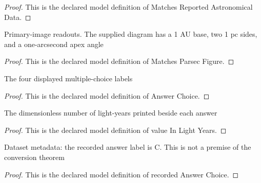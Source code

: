 \begin{proof}
  This is the declared model definition of Matches Reported Astronomical Data.
\end{proof}
\begin{definition}
  \label{def:physics:phyx-mini-0727:phyxminiproblems-problemphyxmini0727-matchesparsecfigure}
  Primary-image readouts. The supplied diagram has a 1 AU base, two 1 pc sides, and a one-arcsecond apex angle
\end{definition}
\begin{proof}
  This is the declared model definition of Matches Parsec Figure.
\end{proof}
\begin{definition}
  \label{def:physics:phyx-mini-0727:phyxminiproblems-problemphyxmini0727-answerchoice}
  The four displayed multiple-choice labels
\end{definition}
\begin{proof}
  This is the declared model definition of Answer Choice.
\end{proof}
\begin{definition}
  \label{def:physics:phyx-mini-0727:phyxminiproblems-problemphyxmini0727-answerchoice-valueinlightyears}
  The dimensionless number of light-years printed beside each answer
\end{definition}
\begin{proof}
  This is the declared model definition of value In Light Years.
\end{proof}
\begin{definition}
  \label{def:physics:phyx-mini-0727:phyxminiproblems-problemphyxmini0727-recordedanswerchoice}
  Dataset metadata: the recorded answer label is C. This is not a premise of the conversion theorem
\end{definition}
\begin{proof}
  This is the declared model definition of recorded Answer Choice.
\end{proof}
